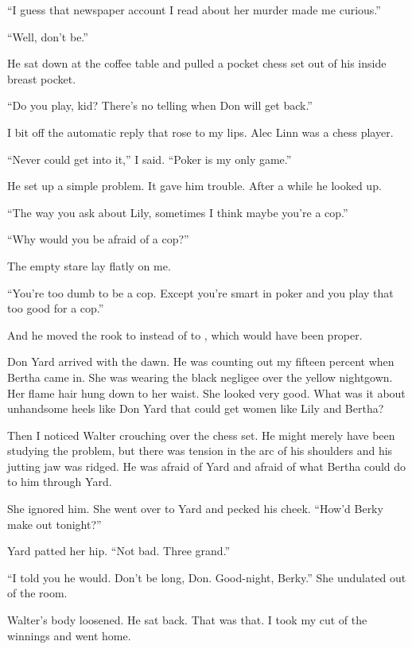 \documentclass{novel}
\begin{document}
“I guess that newspaper account I read about her murder made me curious.”

“Well, don’t be.”

He sat down at the coffee table and pulled a pocket chess set out of his inside breast pocket.

“Do you play, kid? There’s no telling when Don will get back.”

I bit off the automatic reply that rose to my lips. Alec Linn was a chess player.

“Never could get into it,” I said. “Poker is my only game.”

He set up a simple problem. It gave him trouble. After a while he looked up.

“The way you ask about Lily, sometimes I think maybe you’re a cop.”

“Why would you be afraid of a cop?”

The empty stare lay flatly on me.

“You’re too dumb to be a cop. Except you’re smart in poker and you play that too good for a cop.”

And he moved the rook to  instead of to , which would have been proper.

Don Yard arrived with the dawn. He was counting out my fifteen percent when Bertha came in. She was wearing the black negligee over the yellow nightgown. Her flame hair hung down to her waist. She looked very good. What was it about unhandsome heels like Don Yard that could get women like Lily and Bertha?

Then I noticed Walter crouching over the chess set. He might merely have been studying the problem, but there was tension in the arc of his shoulders and his jutting jaw was ridged. He was afraid of Yard and afraid of what Bertha could do to him through Yard.

She ignored him. She went over to Yard and pecked his cheek. “How’d Berky make out tonight?”

Yard patted her hip. “Not bad. Three grand.”

“I told you he would. Don’t be long, Don. Good-night, Berky.” She undulated out of the room.

Walter’s body loosened. He sat back. That was that. I took my cut of the winnings and went home.
\end{document}
